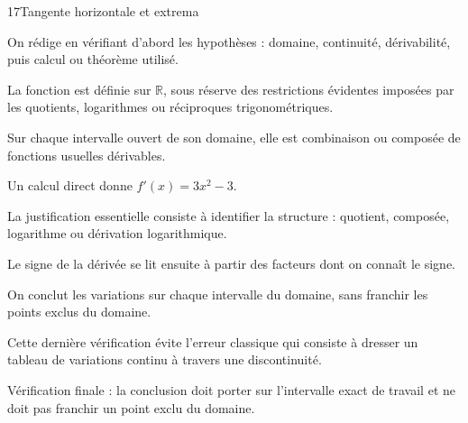 \documentclass[11pt,a4paper]{article}
\newcommand{\R}{\mathbb{R}}
\begin{document}
\begin{corrbox}{17}{Tangente horizontale et extrema}

\begin{methodebox}
On rédige en vérifiant d'abord les hypothèses : domaine, continuité, dérivabilité, puis calcul ou théorème utilisé.
\end{methodebox}

La fonction est définie sur $\R$, sous réserve des restrictions évidentes imposées par les quotients, logarithmes ou réciproques trigonométriques.


Sur chaque intervalle ouvert de son domaine, elle est combinaison ou composée de fonctions usuelles dérivables.


Un calcul direct donne $f'(x)=3x^2-3$.


La justification essentielle consiste à identifier la structure : quotient, composée, logarithme ou dérivation logarithmique.


Le signe de la dérivée se lit ensuite à partir des facteurs dont on connaît le signe.


On conclut les variations sur chaque intervalle du domaine, sans franchir les points exclus du domaine.


Cette dernière vérification évite l'erreur classique qui consiste à dresser un tableau de variations continu à travers une discontinuité.


\begin{attentionbox}
Vérification finale : la conclusion doit porter sur l'intervalle exact de travail et ne doit pas franchir un point exclu du domaine.
\end{attentionbox}

\end{corrbox}
\end{document}

